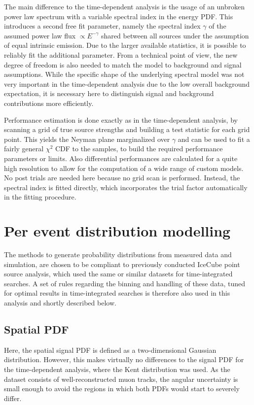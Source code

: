 The main difference to the time-dependent analysis is the usage of an unbroken power law spectrum with a variable spectral index in the energy PDF.
This introduces a second free fit parameter, namely the spectral index $\gamma$ of the assumed power law flux $\propto E^{-\gamma}$ shared between all sources under the assumption of equal intrinsic emission.
Due to the larger available statistics, it is possible to reliably fit the additional parameter.
From a technical point of view, the new degree of freedom is also needed to match the model to background and signal assumptions.
While the specific shape of the underlying spectral model was not very important in the time-dependent analysis due to the low overall background expectation, it is necessary here to distinguish signal and background contributions more efficiently.

Performance estimation is done exactly as in the time-dependent analysis, by scanning a grid of true source strengths and building a test statistic for each grid point.
This yields the Neyman plane marginalized over $\gamma$ and can be used to fit a fairly general $\chi^2$ CDF to the samples, to build the required performance parameters or limits.
Also differential performances are calculated for a quite high resolution to allow for the computation of a wide range of custom models.
No post trials are needed here because no grid scan is performed.
Instead, the spectral index is fitted directly, which incorporates the trial factor automatically in the fitting procedure.


\section{Per event distribution modelling}
The methods to generate probability distributions from measured data and simulation, are chosen to be compliant to previously conducted IceCube point source analysis, which used the same or similar datasets for time-integrated searches.
A set of rules regarding the binning and handling of these data, tuned for optimal results in time-integrated searches is therefore also used in this analysis and shortly described below.

\subsection*{Spatial PDF}
Here, the spatial signal PDF is defined as a two-dimensional Gaussian distribution.
However, this makes virtually no differences to the signal PDF for the time-dependent analysis, where the Kent distribution was used.
As the dataset consists of well-reconstructed muon tracks, the angular uncertainty is small enough to avoid the regions in which both PDFs would start to severely differ.

